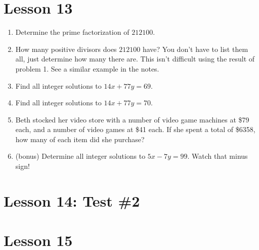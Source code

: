 \documentclass[11pt]{amsart}
\begin{document}
\section{Lesson 13}

\begin{enumerate}

\item Determine the prime factorization of $212100$.\\[5pt]

\item How many positive divisors does $212100$ have?
You don't have to list them all, just determine how many there are. This isn't
difficult using the result of problem 1. See a similar example in the notes. \\[5pt]


\item  Find all integer solutions to $14x+ 77y = 69$.\\[5pt]

\item Find all integer solutions to $14x+ 77y = 70$.\\[5pt]



\item Beth stocked her video store with a number of video game 
machines at \$79 each, and a number of video games at \$41 each.
If she spent a total of \$6358, how many of each item did she purchase?\\[5pt]

\item (bonus) Determine all integer solutions to $5x - 7y = 99$. Watch that minus sign!\\[5pt]

\end{enumerate}

\section{Lesson 14: Test \#2}

\section{Lesson 15}
\end{document}
